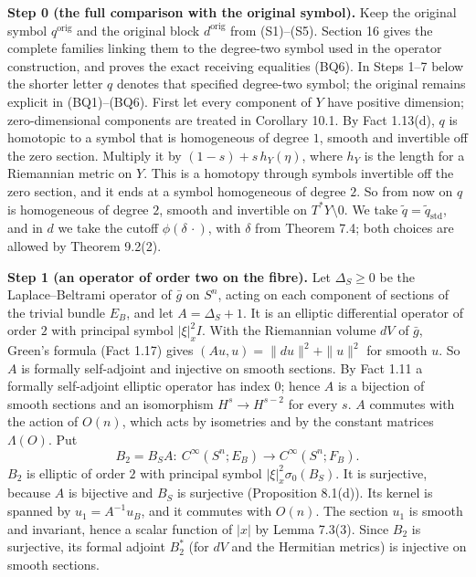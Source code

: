 \documentclass[
  11pt,
]{article}
\begin{document}
\textbf{Step 0 (the full comparison with the original symbol).} Keep the
original symbol \(q^{\mathrm{orig}}\) and the original block
\(d^{\mathrm{orig}}\) from (S1)--(S5). Section 16 gives the complete
families linking them to the degree-two symbol used in the operator
construction, and proves the exact receiving equalities (BQ6). In Steps
1--7 below the shorter letter \(q\) denotes that specified degree-two
symbol; the original remains explicit in (BQ1)--(BQ6). First let every
component of \(Y\) have positive dimension; zero-dimensional components
are treated in Corollary 10.1. By Fact 1.13(d), \(q\) is homotopic to a
symbol that is homogeneous of degree \(1\), smooth and invertible off
the zero section. Multiply it by \((1-s)+s\,h_Y(\eta)\), where \(h_Y\)
is the length for a Riemannian metric on \(Y\). This is a homotopy
through symbols invertible off the zero section, and it ends at a symbol
homogeneous of degree \(2\). So from now on \(q\) is homogeneous of
degree \(2\), smooth and invertible on \(T^*Y\setminus0\). We take
\(\tilde q=\tilde q_{\mathrm{std}}\), and in \(d\) we take the cutoff
\(\phi(\delta\,\cdot)\), with \(\delta\) from Theorem 7.4; both choices
are allowed by Theorem 9.2(2).

\textbf{Step 1 (an operator of order two on the fibre).} Let
\(\Delta_S\ge0\) be the Laplace--Beltrami operator of \(\bar g\) on
\(S^n\), acting on each component of sections of the trivial bundle
\(E_B\), and let \(A=\Delta_S+1\). It is an elliptic differential
operator of order \(2\) with principal symbol \(|\xi|_x^2I\). With the
Riemannian volume \(dV\) of \(\bar g\), Green's formula (Fact 1.17)
gives \((Au,u)=\|du\|^2+\|u\|^2\) for smooth \(u\). So \(A\) is formally
self-adjoint and injective on smooth sections. By Fact 1.11 a formally
self-adjoint elliptic operator has index \(0\); hence \(A\) is a
bijection of smooth sections and an isomorphism \(H^s\to H^{s-2}\) for
every \(s\). \(A\) commutes with the action of \(O(n)\), which acts by
isometries and by the constant matrices \(\Lambda(O)\). Put \[
B_2=B_SA:\ C^\infty(S^n;E_B)\to C^\infty(S^n;F_B).
\tag{10.1}
\] \(B_2\) is elliptic of order \(2\) with principal symbol
\(|\xi|_x^2\sigma_0(B_S)\). It is surjective, because \(A\) is bijective
and \(B_S\) is surjective (Proposition 8.1(d)). Its kernel is spanned by
\(u_1=A^{-1}u_B\), and it commutes with \(O(n)\). The section \(u_1\) is
smooth and invariant, hence a scalar function of \(|x|\) by Lemma
7.3(3). Since \(B_2\) is surjective, its formal adjoint \(B_2^*\) (for
\(dV\) and the Hermitian metrics) is injective on smooth sections.
\end{document}
